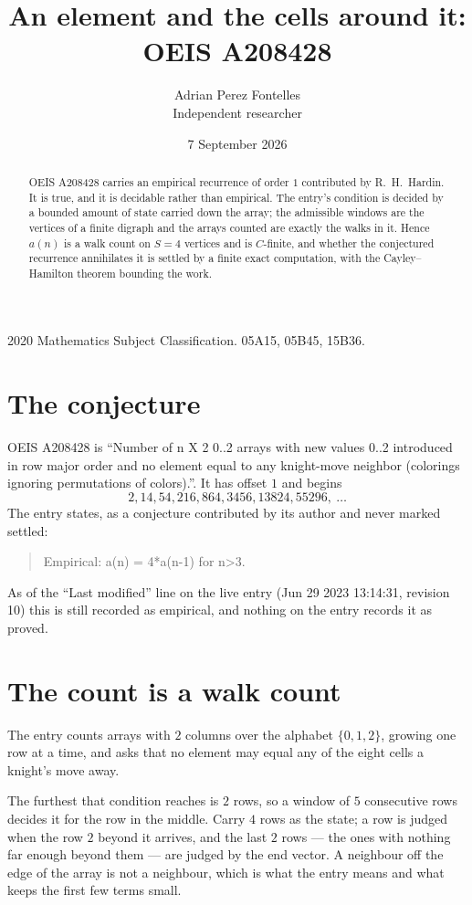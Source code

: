 \documentclass[11pt,a4paper]{article}
\title{An element and the cells around it: OEIS A208428}
\author{Adrian Perez Fontelles\\ \small Independent researcher}
\date{7 September 2026}
\theoremstyle{plain}
\theoremstyle{definition}
\begin{document}
\maketitle

\begin{abstract}
OEIS A208428 carries an empirical recurrence of order $1$ contributed by R.~H.~Hardin. It is
true, and it is decidable rather than empirical. The entry's condition is decided by a bounded amount of state carried down the array; the
admissible windows are the vertices of a finite digraph and the arrays counted are exactly the
walks in it. Hence $a(n)$ is a walk count on $S=4$ vertices and is $C$-finite, and whether the
conjectured recurrence annihilates it is settled by a finite exact computation, with the
Cayley--Hamilton theorem bounding the work.
\end{abstract}

\noindent\small 2020 Mathematics Subject Classification. 05A15, 05B45, 15B36.\normalsize

\section{The conjecture}

OEIS A208428 is ``Number of n X 2 0..2 arrays with new values 0..2 introduced in row major order and no element equal to any knight-move neighbor (colorings ignoring permutations of colors).''. It has offset $1$ and begins
\[
2, 14, 54, 216, 864, 3456, 13824, 55296,\ \dots
\]
The entry states, as a conjecture contributed by its author and never marked settled:
\begin{quote}
Empirical: a(n) = 4*a(n-1) for n>3.
\end{quote}
As of the ``Last modified'' line on the live entry (Jun 29 2023 13:14:31, revision 10) this is still
recorded as empirical, and nothing on the entry records it as proved.

\section{The count is a walk count}

The entry counts arrays with $2$ columns over the alphabet $\{0,1,2\}$, growing one row at a time, and asks that no element may equal any of the eight cells a knight's move away.

The furthest that condition reaches is $2$ rows, so a window of $5$ consecutive rows decides it for the row in the middle. Carry $4$ rows as the state; a row is judged when the row $2$ beyond it arrives, and the last $2$ rows --- the ones with nothing far enough beyond them --- are judged by the end vector. A neighbour off the edge of the array is not a neighbour, which is what the entry means and what keeps the first few terms small.
\end{document}
